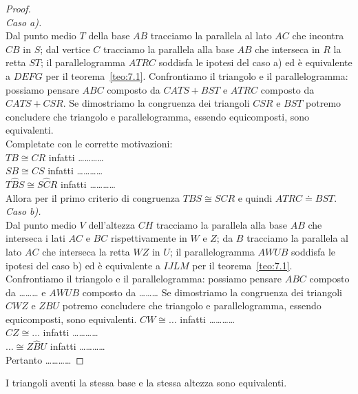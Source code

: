 \begin{proof}~\\
\emph{Caso a).}\\
Dal punto medio $T$ della base $AB$ tracciamo la parallela al lato $AC$ che incontra $CB$ in $S$; dal vertice $C$ tracciamo la parallela alla base $AB$ che interseca in $R$ la retta $ST$; il parallelogramma $ATRC$ soddisfa le ipotesi del caso a) ed è equivalente a $DEFG$ per il teorema~\ref{teo:7.1}.
Confrontiamo il triangolo e il parallelogramma: possiamo pensare $ABC$ composto da $CATS+BST$ e $ATRC$ composto da $CATS+CSR$.
Se dimostriamo la congruenza dei triangoli $CSR$ e $BST$ potremo concludere che triangolo e parallelogramma, essendo equicomposti, sono equivalenti.\\ Completate con le corrette motivazioni:\\
$TB\cong CR$ infatti \ldots\ldots\ldots\ldots{}\\
$SB\cong CS$ infatti \ldots\ldots\ldots\ldots{}\\
$T\widehat{B}S\cong S\widehat{C}R$ infatti \ldots\ldots\ldots\ldots{}\\
Allora per il primo criterio di congruenza $TBS\cong SCR$ e quindi $ATRC\doteq BST$.\\
\emph{Caso b).}\\
Dal punto medio $V$ dell'altezza $CH$ tracciamo la parallela alla base $AB$ che interseca i lati $AC$ e $BC$ rispettivamente in $W$ e $Z$; da $B$ tracciamo la parallela al lato $AC$ che interseca la retta $WZ$ in $U$; il parallelogramma $AWUB$ soddisfa le ipotesi del caso b) ed è equivalente a $IJLM$ per il teorema~\ref{teo:7.1}.
Confrontiamo il triangolo e il parallelogramma: possiamo pensare $ABC$ composto da \ldots\ldots\ldots{} e $AWUB$ composto da \ldots\ldots\ldots{}
Se dimostriamo la congruenza dei triangoli $CWZ$ e $ZBU$ potremo concludere che triangolo e parallelogramma, essendo equicomposti, sono equivalenti.
$CW\cong \ldots{}$ infatti \ldots\ldots\ldots\ldots{}\\
$CZ\cong \ldots{}$ infatti \ldots\ldots\ldots\ldots{}\\
$\ldots{}\cong Z\widehat{B}U$ infatti \ldots\ldots\ldots\ldots{}\\
Pertanto \ldots\ldots\ldots\ldots{}
\end{proof}

\begin{corollario}
I triangoli aventi la stessa base e la stessa altezza sono equivalenti.
\end{corollario}

